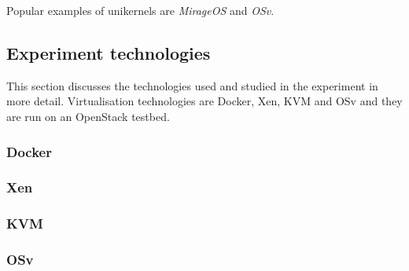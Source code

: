 Popular examples of unikernels are \textit{MirageOS}\cite{mirage} and \textit{OSv}\cite{osv}.

\subsection{Experiment technologies}

This section discusses the technologies used and studied in the experiment in more detail. Virtualisation technologies are Docker, Xen, KVM and OSv and they are run on an OpenStack testbed.

\subsubsection{Docker}


\subsubsection{Xen}
\subsubsection{KVM}
\subsubsection{OSv}

